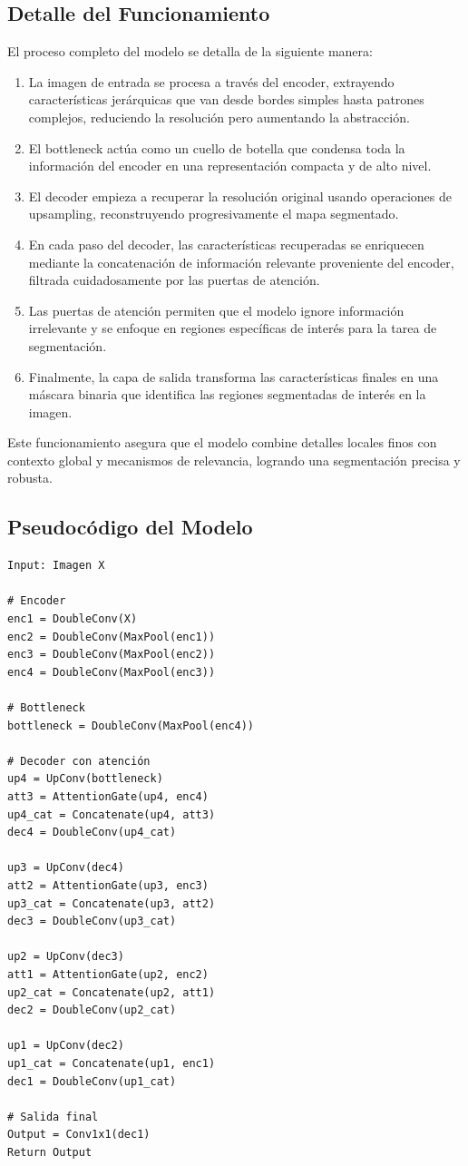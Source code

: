 \subsection*{Detalle del Funcionamiento}
El proceso completo del modelo se detalla de la siguiente manera:
\begin{enumerate}
\item La imagen de entrada se procesa a través del encoder, extrayendo características jerárquicas que van desde bordes simples hasta patrones complejos, reduciendo la resolución pero aumentando la abstracción.
\item El bottleneck actúa como un cuello de botella que condensa toda la información del encoder en una representación compacta y de alto nivel.
\item El decoder empieza a recuperar la resolución original usando operaciones de upsampling, reconstruyendo progresivamente el mapa segmentado.
\item En cada paso del decoder, las características recuperadas se enriquecen mediante la concatenación de información relevante proveniente del encoder, filtrada cuidadosamente por las puertas de atención.
\item Las puertas de atención permiten que el modelo ignore información irrelevante y se enfoque en regiones específicas de interés para la tarea de segmentación.
\item Finalmente, la capa de salida transforma las características finales en una máscara binaria que identifica las regiones segmentadas de interés en la imagen.
\end{enumerate}

Este funcionamiento asegura que el modelo combine detalles locales finos con contexto global y mecanismos de relevancia, logrando una segmentación precisa y robusta.

\subsection*{Pseudocódigo del Modelo}
\begin{verbatim}
Input: Imagen X

# Encoder
enc1 = DoubleConv(X)
enc2 = DoubleConv(MaxPool(enc1))
enc3 = DoubleConv(MaxPool(enc2))
enc4 = DoubleConv(MaxPool(enc3))

# Bottleneck
bottleneck = DoubleConv(MaxPool(enc4))

# Decoder con atención
up4 = UpConv(bottleneck)
att3 = AttentionGate(up4, enc4)
up4_cat = Concatenate(up4, att3)
dec4 = DoubleConv(up4_cat)

up3 = UpConv(dec4)
att2 = AttentionGate(up3, enc3)
up3_cat = Concatenate(up3, att2)
dec3 = DoubleConv(up3_cat)

up2 = UpConv(dec3)
att1 = AttentionGate(up2, enc2)
up2_cat = Concatenate(up2, att1)
dec2 = DoubleConv(up2_cat)

up1 = UpConv(dec2)
up1_cat = Concatenate(up1, enc1)
dec1 = DoubleConv(up1_cat)

# Salida final
Output = Conv1x1(dec1)
Return Output
\end{verbatim}

